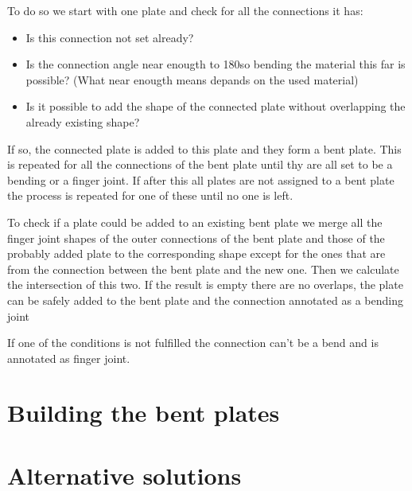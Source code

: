 \documentclass[../ClassicThesis.tex]{subfiles}
\begin{document}
To do so we start with one plate and check for all the connections it has:
\begin{itemize}
\item Is this connection not set already?
\item Is the connection angle near enougth to 180\textdegree so bending the material this far is possible? (What near enougth means depands on the used material)
\item Is it possible to add the shape of the connected plate without overlapping the already existing shape?
\end{itemize}
If so, the connected plate is added to this plate and they form a bent plate. This is repeated for all the connections of the bent plate until thy are all set to be a bending or a finger joint.
If after this all plates are not assigned to a bent plate the process is repeated for one of these until no one is left.

To check if a plate could be added to an existing bent plate we merge all the finger joint shapes of the outer connections of the bent plate and those of the probably added plate to the corresponding shape except for the ones that are from the connection between the bent plate and the new one. Then we calculate the intersection of this two. If the result is empty there are no overlaps, the plate can be safely added to the bent plate and the connection annotated as a bending joint

If one of the conditions is not fulfilled the connection can't be a bend and is annotated as finger joint.

\section{Building the bent plates}
\section{Alternative solutions}
\end{document}
